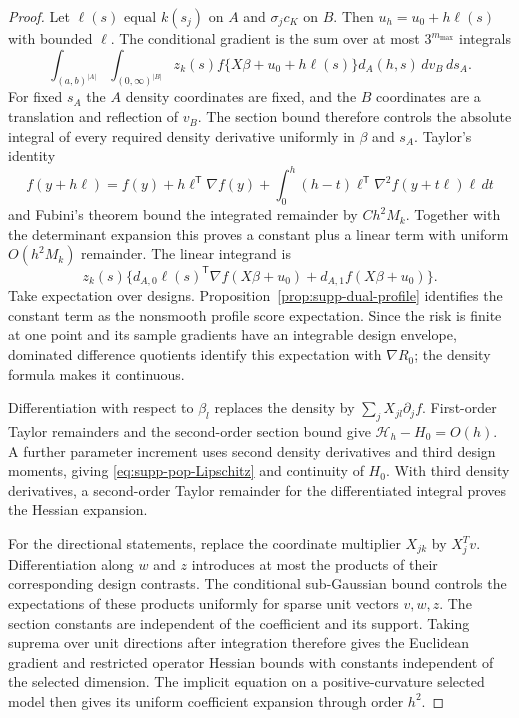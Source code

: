 \begin{proof}
Let $\ell(s)$ equal $k(s_j)$ on $A$ and $\sigma_jc_K$ on $B$.
Then $u_h=u_0+h\ell(s)$ with bounded $\ell$. The conditional
gradient is the sum over at most $3^{m_{\max}}$ integrals
\begin{equation}\label{eq:supp-chart-integral}
 \int_{(a,b)^{|A|}}\int_{(0,\infty)^{|B|}}
 z_k(s)f\{X\beta+u_0+h\ell(s)\}d_A(h,s)\,dv_B\,ds_A.
\end{equation}
For fixed $s_A$ the $A$ density coordinates are fixed, and the
$B$ coordinates are a translation and reflection of $v_B$.
The section bound therefore controls the absolute integral of every
required density derivative uniformly in $\beta$ and $s_A$.
Taylor's identity
\[
 f(y+h\ell)=f(y)+h\ell^{\mathsf T}\nabla f(y)
 +\int_0^h(h-t)\ell^{\mathsf T}\nabla^2f(y+t\ell)\ell\,dt
\]
and Fubini's theorem bound the integrated remainder by $Ch^2M_k$.
Together with the determinant expansion this proves a constant plus
a linear term with uniform $O(h^2M_k)$ remainder. The linear
integrand is
\[
 z_k(s)\{d_{A,0}\ell(s)^{\mathsf T}\nabla f(X\beta+u_0)
                   +d_{A,1}f(X\beta+u_0)\}.
\]
Take expectation over designs. Proposition~\ref{prop:supp-dual-profile}
identifies the constant term as the nonsmooth profile score expectation.
Since the risk is finite at one point and its sample gradients have
an integrable design envelope, dominated difference quotients identify
this expectation with $\nabla R_0$; the density formula makes it
continuous.

Differentiation with respect to $\beta_l$ replaces the density by
$\sum_jX_{jl}\partial_jf$. First-order Taylor remainders and the
second-order section bound give $\mathcal H_h-H_0=O(h)$.
A further parameter increment uses second density derivatives and
third design moments, giving \eqref{eq:supp-pop-Lipschitz} and
continuity of $H_0$. With third density derivatives, a second-order
Taylor remainder for the differentiated integral proves the Hessian
expansion.

For the directional statements, replace the coordinate multiplier
$X_{jk}$ by $X_j^Tv$. Differentiation along $w$ and $z$ introduces
at most the products of their corresponding design contrasts.
The conditional sub-Gaussian bound controls the expectations of
these products uniformly for sparse unit vectors $v,w,z$.
The section constants are independent of the coefficient and its
support. Taking suprema over unit directions after integration
therefore gives the Euclidean gradient and restricted operator
Hessian bounds with constants independent of the selected dimension.
The implicit equation on a positive-curvature selected model then
gives its uniform coefficient expansion through order $h^2$.
\end{proof}


